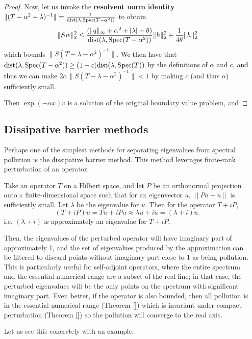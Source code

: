 \documentclass[../main.tex]{subfiles}
\begin{document}
\begin{proof}
Now, let us invoke the \textbf{resolvent norm identity} $\|(T - \alpha^2 -
	\lambda)^{-1}\| = \frac{1}{\mathrm{dist}(\lambda, \mathrm{Spec}(T- \alpha^2))}$
	to obtain $$\|Sw\|^2_2 \leq \frac{(\|q\|_\infty + \alpha^2 + |\lambda| +
	\theta)}{\mathrm{dist}(\lambda, \mathrm{Spec}(T- \alpha^2))}\|h\|^2_2 +
	\frac{1}{4\theta} \|h\|^2_2 $$ which bounds $\|S(T - \lambda -
	\alpha^2)^{-1}\|$. We then have that $\mathrm{dist}(\lambda, \mathrm{Spec}(T-
	\alpha^2)) \geq (1-c)\mathrm{dist}(\lambda, \mathrm{Spec}(T))$ by the
	definitions of $\alpha$ and $c$, and thus we can make $2 \alpha \|S(T -
	\lambda - \alpha^2)^{-1}\| < 1$ by making $c$ (and thus $\alpha$)
	sufficiently small.

Then $\exp(- \alpha x)v$ is a solution of the original boundary value problem,
and \end{proof}

\subsection{Dissipative barrier methods}
\label{sec:dissipative-barrier}
Perhaps one of the simplest methods for separating eigenvalues from spectral
pollution is the dissipative barrier method. This method leverages finite-rank
perturbation of an operator.

Take an operator $T$ on a Hilbert space, and let $P$ be an orthonormal
projection onto a finite-dimensional space  such that for an eigenvector $u$,
$\|Pu - u\|$ is sufficiently small. Let $\lambda$ be the eigenvalue for $u$.
Then for the operator $T+iP$,
$$(T+iP) u = Tu + iPu \approx \lambda u + iu = (\lambda + i)u.$$
i.e. $(\lambda + i)$ is approximately an eigenvalue for $T+iP$. 

Then, the eigenvalues of the perturbed operator will have imaginary part of
approximately 1, and the set of eigenvalues produced by the approximation can be
filtered to discard points without imaginary part close to 1 as being pollution.
This is particularly useful for self-adjoint operators, where the entire
spectrum and the essential numerical range are a subset of the real line; in
that case, the perturbed eigenvalues will be the only points on the spectrum
with significant imaginary part. Even better, if the operator is also bounded,
then all pollution is in the essential numerical range (Theorem \ref{}) which is
invariant under compact perturbation (Theorem \ref{}) so the pollution will
converge to the real axis.

Let us see this concretely with an example.
\end{document}
